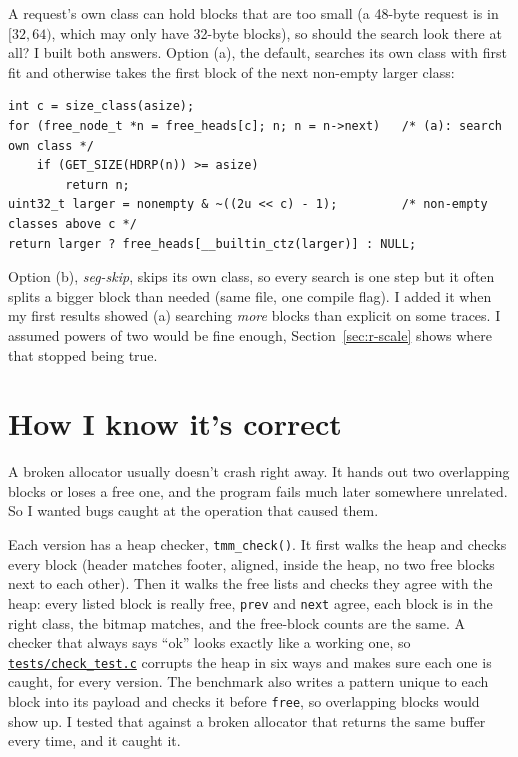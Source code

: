 \documentclass[11pt,letterpaper]{article}
\newcommand{\repo}{https://github.com/yazeed1s/tmalloc}
\newcommand{\src}[1]{\href{\repo/blob/main/#1}{\texttt{#1}}}
\begin{document}
A request's own class can hold blocks that are too small (a 48-byte request is in $[32,64)$, which may only have 32-byte blocks), so should the search look there at all? I built both answers. Option (a), the default, searches its own class with first fit and otherwise takes the first block of the next non-empty larger class:

\begin{lstlisting}
int c = size_class(asize);
for (free_node_t *n = free_heads[c]; n; n = n->next)   /* (a): search own class */
	if (GET_SIZE(HDRP(n)) >= asize)
		return n;
uint32_t larger = nonempty & ~((2u << c) - 1);         /* non-empty classes above c */
return larger ? free_heads[__builtin_ctz(larger)] : NULL;
\end{lstlisting}

Option (b), \emph{seg-skip}, skips its own class, so every search is one step but it often splits a bigger block than needed (same file, one compile flag). I added it when my first results showed (a) searching \emph{more} blocks than explicit on some traces. I assumed powers of two would be fine enough, Section~\ref{sec:r-scale} shows where that stopped being true.

\section{How I know it's correct}
\label{sec:correct}

A broken allocator usually doesn't crash right away. It hands out two overlapping blocks or loses a free one, and the program fails much later somewhere unrelated. So I wanted bugs caught at the operation that caused them.

Each version has a heap checker, \texttt{tmm\_check()}. It first walks the heap and checks every block (header matches footer, aligned, inside the heap, no two free blocks next to each other). Then it walks the free lists and checks they agree with the heap: every listed block is really free, \texttt{prev} and \texttt{next} agree, each block is in the right class, the bitmap matches, and the free-block counts are the same. A checker that always says ``ok'' looks exactly like a working one, so \src{tests/check\_test.c} corrupts the heap in six ways and makes sure each one is caught, for every version. The benchmark also writes a pattern unique to each block into its payload and checks it before \texttt{free}, so overlapping blocks would show up. I tested that against a broken allocator that returns the same buffer every time, and it caught it.
\end{document}
